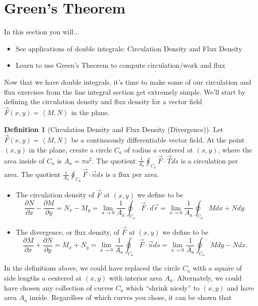 \documentclass[10pt,]{book}
\theoremstyle{plain}
\theoremstyle{definition}
\newtheorem{definition}[theorem]{Definition}
\theoremstyle{definition}
\theoremstyle{definition}
\theoremstyle{definition}
\theoremstyle{definition}
\numberwithin{equation}{section}
\newcommand{\ds}{\displaystyle}
\newcommand{\lt}{<}
\begin{document}
\section[{Green's Theorem}]{Green's Theorem}\label{section-41}
In this section you will... \leavevmode%
\begin{itemize}[label=\textbullet]
\item{}See applications of double integrals: Circulation Density and Flux Density%
\item{}Learn to use Green's Theorem to compute circulation/work and flux%
\end{itemize}
%
\par
Now that we have double integrals, it's time to make some of our circulation and flux exercises from the line integral section get extremely simple. We'll start by defining the circulation density and flux density for a vector field \(\vec F(x,y)=\left\lt M,N\right>\) in the plane.%
\begin{definition}[{Circulation Density and Flux Density (Divergence)}]\label{definition_of_flux_density_in_2D}
Let \(\vec F(x,y)=\left\lt M,N\right>\) be a continuously differentiable vector field. At the point \((x,y)\) in the plane, create a circle \(C_a\) of radius \(a\) centered at \((x,y)\), where the area inside of \(C_a\) is \(A_a=\pi a^2\). The quotient \(\ds \frac{1}{A_a}\oint_{C_a} \vec F \cdot \vec T ds\) is a circulation per area. The quotient \(\ds \frac{1}{A_a}\oint_{C_a} \vec F \cdot \vec n ds\) is a flux per area. \leavevmode%
\begin{itemize}[label=\textbullet]
\item{}The circulation density of \(\vec F\) at \((x,y)\) we define to be%
\begin{equation*}
\frac{\partial N}{\partial x}-\frac{\partial M}{\partial y}=N_x-M_y = \lim_{a\to 0} \frac{1}{A_a}\oint_{C_a} \vec F \cdot  d\vec r = 
\lim_{a\to 0} \frac{1}{A_a}\oint_{C_a} Mdx+Ndy.
\end{equation*}
%
\item{}The divergence, or flux density, of \(\vec F\) at \((x,y)\) we define to be%
\begin{equation*}
\frac{\partial M}{\partial x}+\frac{\partial N}{\partial y}=M_x+N_y=\lim_{a\to 0} \frac{1}{A_a}\oint_{C_a} \vec F \cdot \vec n ds = 
\lim_{a\to 0} \frac{1}{A_a}\oint_{C_a} Mdy-Ndx.
\end{equation*}
%
\end{itemize}
%
\end{definition}
In the definitions above, we could have replaced the circle \(C_a\) with a square of side lengths \(a\) centered at \((x,y)\) with interior area \(A_a\). Alternately, we could have chosen any collection of curves \(C_a\) which ``shrink nicely'' to \((x,y)\) and have area \(A_a\) inside. Regardless of which curves you chose, it can be shown that%
\end{document}
